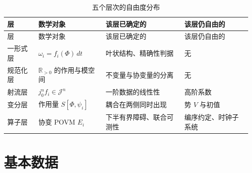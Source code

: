\documentclass[
  chinese,
  a4paper,
  UTF8,
  12pt,
  oneside,
  openany]{ctexbook}
\theoremstyle{plain}
\theoremstyle{plain}
\theoremstyle{plain}
\theoremstyle{definition}
\theoremstyle{plain}
\theoremstyle{plain}
\theoremstyle{remark}
\begin{document}
\begin{longtable}[]{@{}
  >{\raggedright\arraybackslash}p{}
  >{\raggedright\arraybackslash}p{}
  >{\raggedright\arraybackslash}p{}
  >{\raggedright\arraybackslash}p{}@{}}
\caption{五个层次的自由度分布}\label{tbl-layers}\tabularnewline
\toprule\noalign{}
\begin{minipage}[b]{\linewidth}\raggedright
层
\end{minipage} & \begin{minipage}[b]{\linewidth}\raggedright
数学对象
\end{minipage} & \begin{minipage}[b]{\linewidth}\raggedright
该层已确定的
\end{minipage} & \begin{minipage}[b]{\linewidth}\raggedright
该层仍自由的
\end{minipage} \\
\midrule\noalign{}
\endfirsthead
\toprule\noalign{}
\begin{minipage}[b]{\linewidth}\raggedright
层
\end{minipage} & \begin{minipage}[b]{\linewidth}\raggedright
数学对象
\end{minipage} & \begin{minipage}[b]{\linewidth}\raggedright
该层已确定的
\end{minipage} & \begin{minipage}[b]{\linewidth}\raggedright
该层仍自由的
\end{minipage} \\
\midrule\noalign{}
\endhead
\bottomrule\noalign{}
\endlastfoot
一形式层 & \(\omega_i = f_i(\Phi)\,dt\) & 叶状结构、精确性判据 & 无 \\
规范化层 & \(\mathbb{R}_{>0}\) 的作用与模空间 & 不变量与协变量的分离 &
无 \\
射流层 & \(j^{n}_{0}f_i \in \mathcal{J}^{n}\) & 一阶数据的线性性 &
高阶系数 \\
变分层 & 作用量 \(S[\Phi,\psi_i]\) & 耦合在两侧同时出现 & 势 \(V\)
与初值 \\
算子层 & 协变 POVM \(E_i\) & 下半有界障碍、联合可测性 &
编序约定、时钟子系统 \\
\end{longtable}

\section{基本数据}\label{sec-cc-data}
\end{document}
